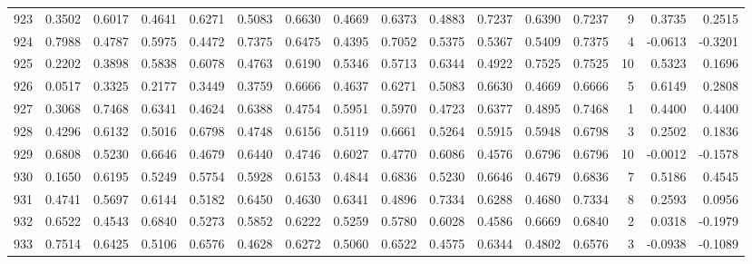 \begin{tabular}{lrrrrrrrrrrrrrrr}
923 &      0.3502 &  0.6017 &  0.4641 &  0.6271 &  0.5083 &  0.6630 &  0.4669 &  0.6373 &  0.4883 &  0.7237 &   0.6390 &     0.7237 &      9 &                    0.3735 &                     0.2515 \\
924 &      0.7988 &  0.4787 &  0.5975 &  0.4472 &  0.7375 &  0.6475 &  0.4395 &  0.7052 &  0.5375 &  0.5367 &   0.5409 &     0.7375 &      4 &                   -0.0613 &                    -0.3201 \\
925 &      0.2202 &  0.3898 &  0.5838 &  0.6078 &  0.4763 &  0.6190 &  0.5346 &  0.5713 &  0.6344 &  0.4922 &   0.7525 &     0.7525 &     10 &                    0.5323 &                     0.1696 \\
926 &      0.0517 &  0.3325 &  0.2177 &  0.3449 &  0.3759 &  0.6666 &  0.4637 &  0.6271 &  0.5083 &  0.6630 &   0.4669 &     0.6666 &      5 &                    0.6149 &                     0.2808 \\
927 &      0.3068 &  0.7468 &  0.6341 &  0.4624 &  0.6388 &  0.4754 &  0.5951 &  0.5970 &  0.4723 &  0.6377 &   0.4895 &     0.7468 &      1 &                    0.4400 &                     0.4400 \\
928 &      0.4296 &  0.6132 &  0.5016 &  0.6798 &  0.4748 &  0.6156 &  0.5119 &  0.6661 &  0.5264 &  0.5915 &   0.5948 &     0.6798 &      3 &                    0.2502 &                     0.1836 \\
929 &      0.6808 &  0.5230 &  0.6646 &  0.4679 &  0.6440 &  0.4746 &  0.6027 &  0.4770 &  0.6086 &  0.4576 &   0.6796 &     0.6796 &     10 &                   -0.0012 &                    -0.1578 \\
930 &      0.1650 &  0.6195 &  0.5249 &  0.5754 &  0.5928 &  0.6153 &  0.4844 &  0.6836 &  0.5230 &  0.6646 &   0.4679 &     0.6836 &      7 &                    0.5186 &                     0.4545 \\
931 &      0.4741 &  0.5697 &  0.6144 &  0.5182 &  0.6450 &  0.4630 &  0.6341 &  0.4896 &  0.7334 &  0.6288 &   0.4680 &     0.7334 &      8 &                    0.2593 &                     0.0956 \\
932 &      0.6522 &  0.4543 &  0.6840 &  0.5273 &  0.5852 &  0.6222 &  0.5259 &  0.5780 &  0.6028 &  0.4586 &   0.6669 &     0.6840 &      2 &                    0.0318 &                    -0.1979 \\
933 &      0.7514 &  0.6425 &  0.5106 &  0.6576 &  0.4628 &  0.6272 &  0.5060 &  0.6522 &  0.4575 &  0.6344 &   0.4802 &     0.6576 &      3 &                   -0.0938 &                    -0.1089 \\

\end{tabular}
